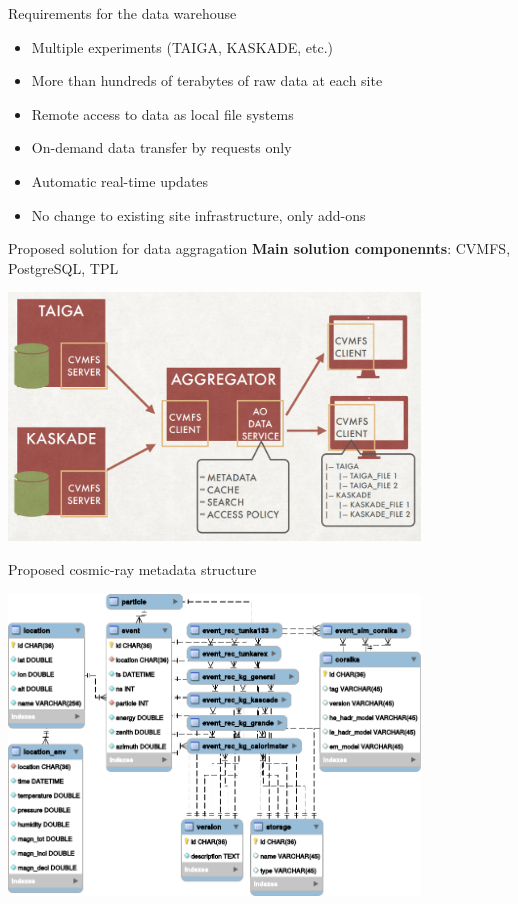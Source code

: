 
\begin{frame}{Requirements for the data warehouse}
 \begin{itemize}
    \item Multiple experiments (TAIGA, KASKADE, etc.)
    \item More than hundreds of terabytes of raw data at each site
    \item Remote access to data as local file systems
    \item  On-demand data transfer by requests only
    \item  Automatic real-time updates
    \item  No change to existing site infrastructure, only add-ons
 \end{itemize}
\end{frame}

\begin{frame}{Proposed solution for data aggragation}
\textbf{Main solution componennts}: CVMFS, PostgreSQL, TPL 
    \begin{center}
        \includegraphics[width=0.82\textwidth]{pics/agr.pdf}
    \end{center}

\end{frame}


    \begin{frame}{Proposed cosmic-ray metadata structure}
        \vspace{-1.5em}
        \begin{center}
            \includegraphics[width=0.82\textwidth]{pics/metadata.pdf}
        \end{center}
    \end{frame}

